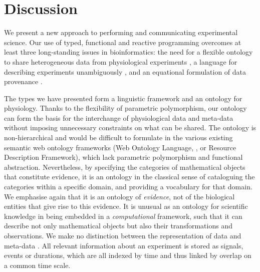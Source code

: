 \section*{Discussion}

We present a new approach to performing and communicating
experimental science.  Our use of
typed, functional and reactive programming overcomes at least three
long-standing issues in bioinformatics: the need for a flexible
ontology to share heterogeneous data from physiological experiments
\citep{Amari2002}, a language for describing experiments unambiguously
\citep{Murray-Rust2002}, and an equational formulation of data
provenance \citep{Pool2002}. 

The types we have presented form a linguistic framework and an
ontology for physiology. Thanks to the flexibility of parametric
polymorphism, our ontology can form the basis for the interchange of
physiological data and meta-data without imposing unnecessary
constraints on what can be shared. The ontology is non-hierarchical
and would be difficult to formulate in the various existing semantic
web ontology frameworks (Web Ontology Language, \citep{owlref}, or
Resource Description Framework), which lack parametric polymorphism
and functional abstraction. Nevertheless, by specifying the categories
of mathematical objects that constitute evidence, it is an ontology in
the classical sense of cataloguing the categories within a specific
domain, and providing a vocabulary for that domain. We emphasise again
that it is an ontology of \emph{evidence}, not of the biological
entities that give rise to this evidence. It is unusual as an ontology
for scientific knowledge in being embedded in a \emph{computational}
framework, such that it can describe not only mathematical objects but
also their transformations and observations. We make no distinction between
the representation of data and meta-data \citep{Bower2009,
  Gibson2008}. All relevant information about an experiment is stored
as signals, events or durations, which are all indexed by time and
thus linked by overlap on a common time scale.

